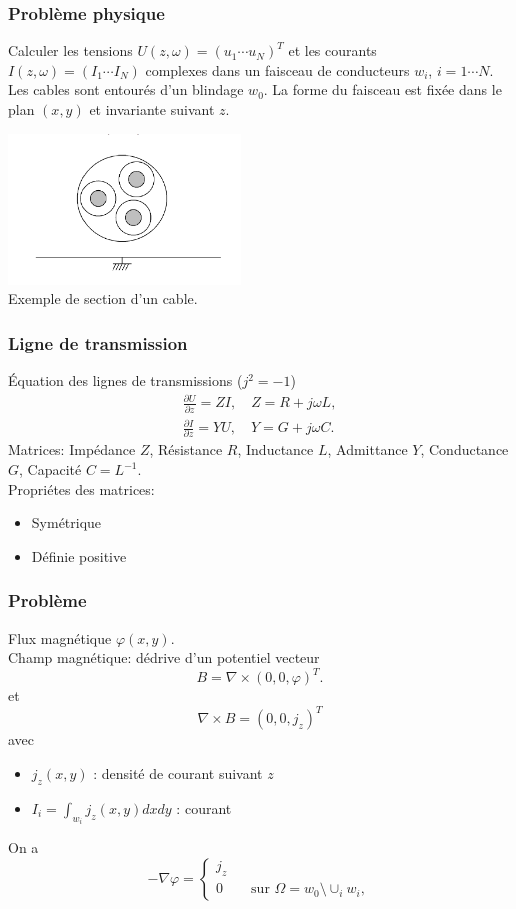 \begin{frame}
  \frametitle{Probl\`eme physique}
  Calculer les tensions $U(z,\omega) =(u_1 \cdots u_N)^T$ et les courants
  $I(z,\omega) = (I_1\cdots I_N)$ complexes dans un faisceau de conducteurs
  $w_i$, $i=1\cdots N$. Les cables sont entour\'es d'un blindage $w_0$. La forme
  du faisceau est fix\'ee dans le plan $(x,y)$ et invariante suivant $z$.
  \begin{center}
    \includegraphics[height=4cm]{figures/f1}\\
    \small  Exemple de section d'un cable.
  \end{center}
\end{frame}


\begin{frame}
\frametitle{Ligne de transmission}
\'Equation des lignes de transmissions ($j^2=-1$)
\begin{eqnarray*}
\frac{\partial U}{\partial z} =ZI, \quad Z=R+j\omega L,\\
\frac{\partial I}{\partial z} =YU, \quad Y=G+j\omega C.
\end{eqnarray*}
Matrices: 
Imp\'edance $Z$, R\'esistance $R$, Inductance $L$, Admittance $Y$, Conductance $G$, Capacit\'e
$C=L^{-1}.$\\[0.4cm]
Propri\'etes des matrices: 
\begin{itemize}
\item Sym\'etrique
\item D\'efinie positive
\end{itemize}

\end{frame} 

\begin{frame}
\frametitle{Probl\`eme}
Flux magn\'etique $\varphi(x,y)$. \\
Champ magn\'etique: d\'edrive d'un potentiel vecteur 
$$B=\nabla \times (0,0,\varphi)^T.$$ et
$$\nabla\times B=(0,0,j_z)^T$$ avec
\begin{itemize}
\item  $j_z(x,y)$ : densit\'e de courant suivant $z$
\item  $I_i= \int _{w_i}j_z(x,y)dxdy$ :  courant
\end{itemize}
On a
\begin{equation}
-\nabla\varphi =
\begin{cases}
j_z \\ 
0 \qquad \text{sur } \Omega =w_0 \setminus \cup_i w_i,
\end{cases}
\end{equation} 
\end{frame}

